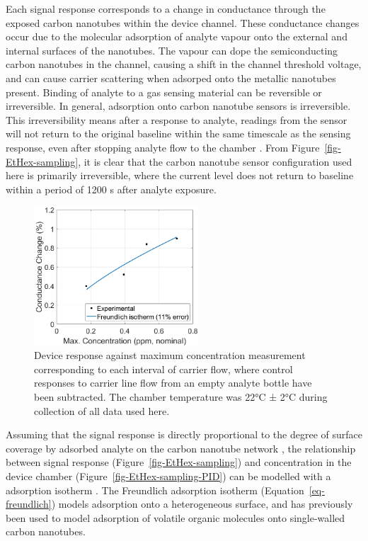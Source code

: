 \documentclass[
  a4paper,
]{scrbook}
\begin{document}
Each signal response corresponds to a change in conductance through the
exposed carbon nanotubes within the device channel. These conductance
changes occur due to the molecular adsorption of analyte vapour onto the
external and internal surfaces of the nanotubes. The vapour can dope the
semiconducting carbon nanotubes in the channel, causing a shift in the
channel threshold voltage, and can cause carrier scattering when
adsorped onto the metallic nanotubes present. Binding of analyte to a
gas sensing material can be reversible or irreversible. In general,
adsorption onto carbon nanotube sensors is irreversible. This
irreversibility means after a response to analyte, readings from the
sensor will not return to the original baseline within the same
timescale as the sensing response, even after stopping analyte flow to
the chamber \autocite{Agnihotri2005,Lee2005}. From
Figure~\ref{fig-EtHex-sampling}, it is clear that the carbon nanotube
sensor configuration used here is primarily irreversible, where the
current level does not return to baseline within a period of 1200 s
after analyte exposure.

\begin{figure}

{\centering \includegraphics[width=0.55\textwidth,height=\textheight]{figures/ch9/EtHex-ratio-comparison.png}

}

\caption{\label{fig-EtHex-ratio-comparison}Device response against
maximum concentration measurement corresponding to each interval of
carrier flow, where control responses to carrier line flow from an empty
analyte bottle have been subtracted. The chamber temperature was 22°C ±
2°C during collection of all data used here.}

\end{figure}

Assuming that the signal response is directly proportional to the degree
of surface coverage by adsorbed analyte on the carbon nanotube network
\autocite{Lee2005}, the relationship between signal response
(Figure~\ref{fig-EtHex-sampling}) and concentration in the device
chamber (Figure~\ref{fig-EtHex-sampling-PID}) can be modelled with a
adsorption isotherm \autocite{Agnihotri2005}. The Freundlich adsorption
isotherm (Equation~\ref{eq-freundlich}) models adsorption onto a
heterogeneous surface, and has previously been used to model adsorption
of volatile organic molecules onto single-walled carbon nanotubes.
\end{document}

